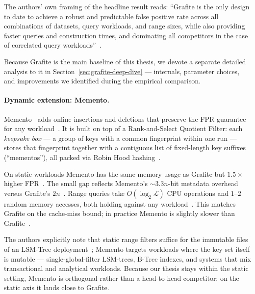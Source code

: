 The authors' own framing of the headline result reads:
``Grafite is the only design to date to achieve a robust and predictable false
positive rate across all combinations of datasets, query workloads,
and range sizes, while also providing faster queries and
construction times, and dominating all competitors in the case of
correlated query workloads''~\citep[\S1]{grafite2024}.

Because Grafite is the main baseline of this thesis, we devote a
separate detailed analysis to it in
Section~\ref{sec:grafite-deep-dive} --- internals, parameter
choices, and improvements we identified during the empirical
comparison.

\paragraph{Dynamic extension: Memento.}
Memento~\citep{eslami2024memento} adds online insertions and
deletions that preserve the FPR guarantee for any
workload~\citep[\S1, \S4]{eslami2024memento}.
It is built on top of a Rank-and-Select Quotient Filter: each \emph{keepsake
box} --- a group of keys with a common fingerprint within one run
--- stores that fingerprint together with a contiguous list of
fixed-length key suffixes (``mementos''), all packed via Robin Hood
hashing~\citep[\S3, \S4]{eslami2024memento}.

On static workloads Memento has the same memory usage as Grafite
but $1.5\times$ higher FPR~\citep[\S7.1, Fig.~9]{eslami2024memento}.
The small gap reflects Memento's ${\sim}3.3n$-bit metadata overhead
versus Grafite's $2n$~\citep[\S6]{eslami2024memento}.
Range queries take $O(\log_2 \mathcal{L})$ CPU operations and
$1$--$2$ random memory accesses, both holding against any
workload~\citep[\S6, Table~1]{eslami2024memento}. This matches
Grafite on the cache-miss bound; in practice Memento is slightly
slower than Grafite~\citep[\S7.1]{eslami2024memento}.

The authors explicitly note that static range filters suffice for the immutable files of an
LSM-Tree deployment~\citep[\S1]{eslami2024memento}; Memento targets
workloads where the key set itself is mutable --- single-global-filter
LSM-trees, B-Tree indexes, and systems that mix transactional and analytical workloads.
Because our thesis stays within the static setting, Memento is
orthogonal rather than a head-to-head competitor; on the static axis
it lands close to Grafite.
